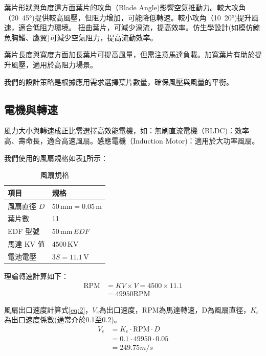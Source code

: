 \documentclass[12pt]{article}       %
\begin{document}
葉片形狀與角度這方面葉片的攻角（Blade Angle)影響空氣推動力。較大攻角（20~45°)提供較高風壓，但阻力增加，可能降低轉速。較小攻角（10~20°)提升風速，適合低阻力環境。
扭曲葉片，可減少渦流，提高效率。仿生學設計(如模仿鯨魚胸鰭、鷹翼)可減少空氣阻力，提高流動效率。

葉片長度與寬度方面加長葉片可提高風量，但需注意馬達負載。加寬葉片有助於提升風壓，適用於高阻力場景。

我們的設計策略是根據應用需求選擇葉片數量，確保風壓與風量的平衡。

\subsection{電機與轉速} 
\hspace{2em}風力大小與轉速成正比需選擇高效能電機，如：無刷直流電機（BLDC)：效率高、壽命長，適合高速風扇。感應電機（Induction Motor)：適用於大功率風扇。

我們使用的風扇規格如表\ref{tab:fan}所示：
    \begin{table}[H]
        \centering
        \caption{風扇規格}
        \vspace{6pt} %
        \label{tab:fan}
        \begin{tabular}{ll}
            \toprule
            \textbf{項目} & \textbf{規格} \\
            \midrule
            風扇直徑 \(D\) & \(50\,\mathrm{mm} = 0.05\,\mathrm{m}\) \\
            葉片數 & 11 \\
            EDF 型號 & \(50\,\mathrm{mm}\,EDF\) \\
            馬達 KV 值 & \(4500\,\mathrm{KV}\)\\
            電池電壓 & \(3S = 11.1\,\mathrm{V}\)\\
            \bottomrule
        \end{tabular}
    \end{table}

    理論轉速計算如下：
    \begin{align}
        \text{RPM} &= KV \times V = 4500 \times 11.1  \label{eq:1}
        \\
        &= 49950\text{RPM} \nonumber
    \end{align}

    風扇出口速度計算式\ref{eq:2}，$V_e$為出口速度，$\text{RPM}$為馬達轉速，$\text{D}$為風扇直徑，$K_e$為出口速度係數(通常介於0.1至0.2)。
    \begin{align}
        V_e &= K_e \cdot \text{RPM} \cdot D  \label{eq:2}
        \\
        &= 0.1 \cdot 49950 \cdot 0.05  \nonumber
        \\
        &= 249.75 m/s \nonumber
    \end{align}
\end{document}
